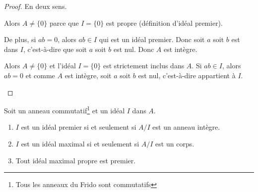 \begin{proof}
	En deux sens.
	\begin{subproof}
		Alors \( A\neq \{ 0 \}\) parce que \( I=\{ 0 \}\) est propre (définition d'idéal premier).

		De plus, si \( ab=0\), alors \( ab\in I\) qui est un idéal premier. Donc soit \( a\) soit \( b\) est dans \( I\), c'est-à-dire que soit \( a\) soit \( b\) est nul. Donc \( A\) est intègre.

		Alors \( A\neq \{ 0 \}\) et l'idéal \( I=\{ 0 \}\) est strictement inclus dans \( A\). Si \( ab\in I\), alors \( ab=0\) et comme \( A\) est intègre, soit \( a\) soit \( b\) est nul, c'est-à-dire appartient à \( I\).
	\end{subproof}
\end{proof}

\begin{proposition}      \label{PROPooRUQKooIfbnQX}
	Soit un anneau commutatif\footnote{Tous les anneaux du Frido sont commutatifs} et un idéal \( I\) dans \( A\).
	\begin{enumerate}
		\item       \label{ITEMooUGBTooOGrnWl}
		      \( I\) est un idéal premier si et seulement si \( A/I\) est un anneau intègre.
		\item   \label{ITEMooGLXSooUjINqR}
		      \( I\) est un idéal maximal si et seulement si \( A/I\) est un corps.
		\item       \label{ITEMooTFFQooOUajFw}
		      Tout idéal maximal propre est premier.
	\end{enumerate}
\end{proposition}

